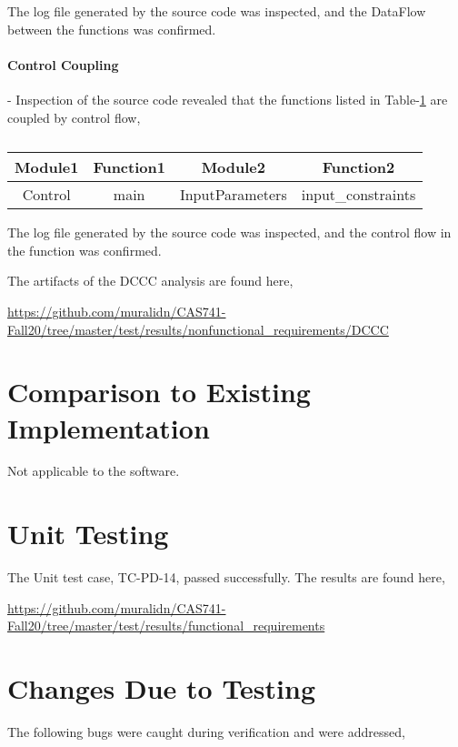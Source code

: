 \documentclass[12pt, titlepage]{article}
\begin{document}
The log file generated by the source code was inspected, and the DataFlow between the 
functions was confirmed.

\paragraph{Control Coupling} - Inspection of the source code revealed that the functions listed in Table-\ref{tab:ctrlCoupling}  
are coupled by control flow,

\begin{table}[]
\caption{}
\label{tab:ctrlCoupling}
\begin{tabular}{c|c|c|c}
\multicolumn{1}{c|}{Module1} & \multicolumn{1}{c|}{Function1} & Module2         & Function2     \\ \hline
Control                      & main                           & InputParameters & input\_constraints    \\
\end{tabular}
\end{table}

The log file generated by the source code was inspected, and the control flow in the 
function was confirmed.

The artifacts of the DCCC analysis are found here,

 \url{https://github.com/muralidn/CAS741-Fall20/tree/master/test/results/nonfunctional_requirements/DCCC}
	
\section{Comparison to Existing Implementation}	

Not applicable to the \progname{} software.

\section{Unit Testing}

The Unit test case, TC-PD-14, passed successfully. The results are found here,

  \url{https://github.com/muralidn/CAS741-Fall20/tree/master/test/results/functional_requirements}

\section{Changes Due to Testing}

The following bugs were caught during verification and were addressed,
\end{document}
